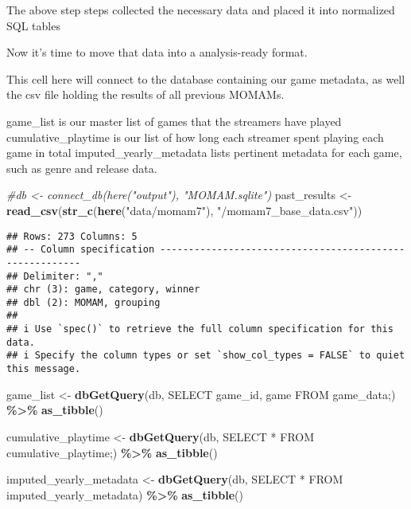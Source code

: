 \documentclass[
]{article}
\newenvironment{Shaded}{\begin{snugshade}}{\end{snugshade}}
\newcommand{\CommentTok}[1]{\textcolor[rgb]{0.56,0.35,0.01}{\textit{#1}}}
\newcommand{\FunctionTok}[1]{\textcolor[rgb]{0.13,0.29,0.53}{\textbf{#1}}}
\newcommand{\NormalTok}[1]{#1}
\newcommand{\OtherTok}[1]{\textcolor[rgb]{0.56,0.35,0.01}{#1}}
\newcommand{\SpecialCharTok}[1]{\textcolor[rgb]{0.81,0.36,0.00}{\textbf{#1}}}
\newcommand{\StringTok}[1]{\textcolor[rgb]{0.31,0.60,0.02}{#1}}
\begin{document}
The above step steps collected the necessary data and placed it into
normalized SQL tables

Now it's time to move that data into a analysis-ready format.

This cell here will connect to the database containing our game
metadata, as well the csv file holding the results of all previous
MOMAMs.

game\_list is our master list of games that the streamers have played
cumulative\_playtime is our list of how long each streamer spent playing
each game in total imputed\_yearly\_metadata lists pertinent metadata
for each game, such as genre and release data.

\begin{Shaded}
\begin{Highlighting}[]
\CommentTok{\#db \textless{}{-} connect\_db(here("output"), "MOMAM.sqlite")}
\NormalTok{past\_results }\OtherTok{\textless{}{-}} \FunctionTok{read\_csv}\NormalTok{(}\FunctionTok{str\_c}\NormalTok{(}\FunctionTok{here}\NormalTok{(}\StringTok{"data/momam7"}\NormalTok{), }\StringTok{"/momam7\_base\_data.csv"}\NormalTok{))}
\end{Highlighting}
\end{Shaded}

\begin{verbatim}
## Rows: 273 Columns: 5
## -- Column specification --------------------------------------------------------
## Delimiter: ","
## chr (3): game, category, winner
## dbl (2): MOMAM, grouping
## 
## i Use `spec()` to retrieve the full column specification for this data.
## i Specify the column types or set `show_col_types = FALSE` to quiet this message.
\end{verbatim}

\begin{Shaded}
\begin{Highlighting}[]
\NormalTok{game\_list }\OtherTok{\textless{}{-}} \FunctionTok{dbGetQuery}\NormalTok{(db, }\StringTok{\textquotesingle{}SELECT game\_id, game FROM game\_data;\textquotesingle{}}\NormalTok{) }\SpecialCharTok{\%\textgreater{}\%}
  \FunctionTok{as\_tibble}\NormalTok{()}

\NormalTok{cumulative\_playtime }\OtherTok{\textless{}{-}} \FunctionTok{dbGetQuery}\NormalTok{(db, }\StringTok{\textquotesingle{}SELECT * FROM cumulative\_playtime;\textquotesingle{}}\NormalTok{) }\SpecialCharTok{\%\textgreater{}\%}
  \FunctionTok{as\_tibble}\NormalTok{()}

\NormalTok{imputed\_yearly\_metadata }\OtherTok{\textless{}{-}} \FunctionTok{dbGetQuery}\NormalTok{(db, }\StringTok{\textquotesingle{}SELECT * FROM imputed\_yearly\_metadata\textquotesingle{}}\NormalTok{) }\SpecialCharTok{\%\textgreater{}\%}
  \FunctionTok{as\_tibble}\NormalTok{()}
\end{Highlighting}
\end{Shaded}
\end{document}
